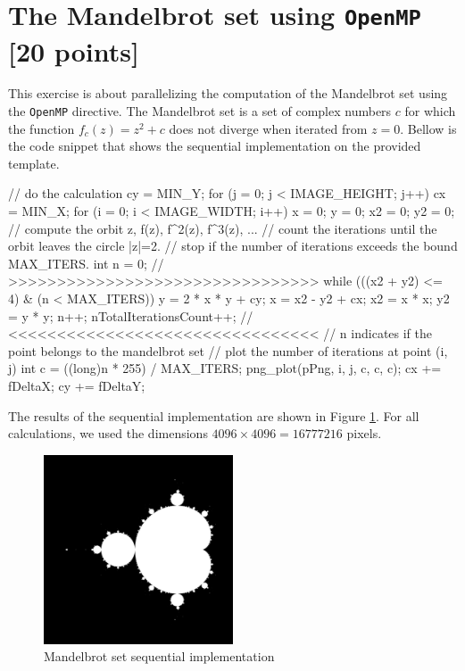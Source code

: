 \documentclass[unicode,11pt,a4paper,oneside,numbers=endperiod,openany]{scrartcl}
\begin{document}
\section{The Mandelbrot set  using \texttt{OpenMP} [20 points]}
This exercise is about parallelizing the computation of the Mandelbrot set using
the \texttt{OpenMP} directive. The Mandelbrot set is a set of complex numbers
$c$ for which the function $f_c(z) = z^2 + c$ does not diverge when iterated
from $z = 0$.
Bellow is the code snippet that shows the sequential implementation on the provided
template.
\begin{cppverbatim}
// do the calculation
cy = MIN_Y;
for (j = 0; j < IMAGE_HEIGHT; j++)
{
  cx = MIN_X;
  for (i = 0; i < IMAGE_WIDTH; i++)
  {
    x = 0;
    y = 0;
    x2 = 0;
    y2 = 0;
    // compute the orbit z, f(z), f^2(z), f^3(z), ...
    // count the iterations until the orbit leaves the circle |z|=2.
    // stop if the number of iterations exceeds the bound MAX_ITERS.
    int n = 0;
    // >>>>>>>>>>>>>>>>>>>>>>>>>>>>>>>>
    while (((x2 + y2) <= 4) & (n < MAX_ITERS))
    {
      y = 2 * x * y + cy;
      x = x2 - y2 + cx;
      x2 = x * x;
      y2 = y * y;
      n++;
      nTotalIterationsCount++;
    }
    // <<<<<<<<<<<<<<<<<<<<<<<<<<<<<<<<
    // n indicates if the point belongs to the mandelbrot set
    // plot the number of iterations at point (i, j)
    int c = ((long)n * 255) / MAX_ITERS;
    png_plot(pPng, i, j, c, c, c);
    cx += fDeltaX;
  }
  cy += fDeltaY;
}
\end{cppverbatim}
The results of the sequential implementation are shown in Figure
\ref{fig:mandelbrot-sequential}. For all calculations, we used the dimensions
$4096\times 4096=16777216$ pixels.
\begin{figure}[h]
  \centering
  \includegraphics[width=0.5\textwidth]{../mandel/mandel_seq.png}
  \caption{Mandelbrot set sequential implementation}
  \label{fig:mandelbrot-sequential}
\end{figure}
\end{document}
